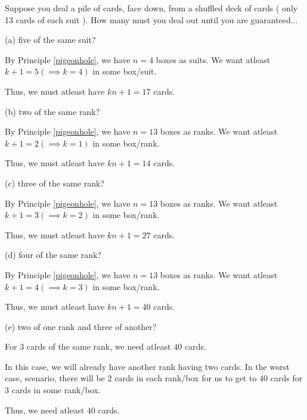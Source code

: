\begin{problem}
	Suppose you deal a pile of cards, face down, from a shuffled deck of cards ( only 13 cards of each suit ). How many must you deal out until you are guaranteed...

	(a) five of the same suit?

	\begin{solution}
		By Principle \ref{pigeonhole}, we have $n = 4$ boxes as suits. 
		We want atleast $k + 1 = 5 (\implies k = 4)$ in some box/suit.

		Thus, we must atleast have $kn+1 = 17$ cards.
	\end{solution}

	(b) two of the same rank?
	\begin{solution}
		By Principle \ref{pigeonhole}, we have $n = 13$ boxes as ranks. 
		We want atleast $k + 1 = 2 (\implies k = 1)$ in some box/rank.

		Thus, we must atleast have $kn+1 = 14$ cards.
	\end{solution}

	(c) three of the same rank?
	\begin{solution}
		By Principle \ref{pigeonhole}, we have $n = 13$ boxes as ranks. 
		We want atleast $k + 1 = 3 (\implies k = 2)$ in some box/rank.

		Thus, we must atleast have $kn+1 = 27$ cards.
	\end{solution}

	(d) four of the same rank?
	\begin{solution}
		By Principle \ref{pigeonhole}, we have $n = 13$ boxes as ranks. 
		We want atleast $k + 1 = 4 (\implies k = 3)$ in some box/rank.

		Thus, we must atleast have $kn+1 = 40$ cards.
	\end{solution}

	(e) two of one rank and three of another?
	\begin{solution}
		For $3$ cards of the same rank, we need atleast $40$ cards.
		
		In this case, we will already have another rank having two cards. 
		In the worst case, scenario, there will be $2$ cards in each rank/box for us to get to $40$ cards for $3$ cards in some rank/box.

		Thus, we need atleast $40$ cards.
	\end{solution}
\end{problem}


